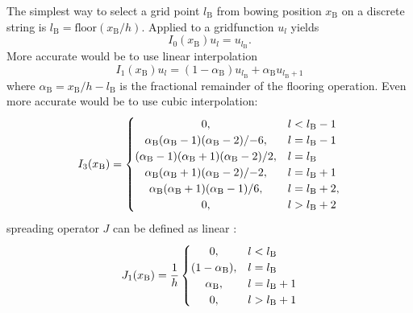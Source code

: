 \documentclass[twoside,a4paper]{article}
\begin{document}
The simplest way to select a grid point $l_\text{B}$ from bowing position $x_\text{B}$ on a discrete string is $l_\text{B} = \text{floor}(x_\text{B}/h)$. Applied to a gridfunction $u_l$ yields
\begin{equation}
    I_0(x_\text{B})u_l = u_{l_\text{B}}.
\end{equation}
More accurate would be to use linear interpolation 
\begin{equation}\label{eq:linearInterpolation}
     I_1(x_\text{B})u_l =
      (1-\alpha_\text{B})u_{l_\text{B}}+ \alpha_\text{B}u_{l_\text{B}+1}
\end{equation}
where $\alpha_\text{B} = x_\text{B}/h - l_\text{B}$ is the fractional remainder of the flooring operation. Even more accurate would be to use cubic interpolation:
\begin{equation}
I_3(x_\text{B}) =
     \begin{cases}
    \hfil 0, & l < l_{\text{B}} - 1\\
    \hfil \alpha_\text{B}(\alpha_\text{B}-1)(\alpha_\text{B} - 2)/{-6}, & l = l_{\text{B}} - 1\\
    \hfil (\alpha_\text{B}-1)(\alpha_\text{B}+1)(\alpha_\text{B}-2)/2, & l = l_{\text{B}}\\
    \hfil \alpha_\text{B}(\alpha_\text{B}+1)(\alpha_\text{B} - 2)/{-2}, & l = l_{\text{B}} + 1\\
    \hfil \alpha_\text{B}(\alpha_\text{B}+1)(\alpha_\text{B} - 1)/6, & l = l_{\text{B}} +2,\\
    \hfil 0, & l > l_\text{B} + 2
    \end{cases}
    \end{equation}
spreading operator $J$ can be defined as linear \cite{Bilbao2009}:
\begin{equation}\label{eq:linearInterpolation}
     J_1(x_\text{B}) = \frac{1}{h}
     \begin{cases}
    \hfil 0, & l < l_{\text{B}}\\
    \hfil (1-\alpha_\text{B}), & l = l_{\text{B}}\\
    \hfil \alpha_\text{B}, & l = l_{\text{B}} + 1\\
    \hfil 0, & l > l_\text{B} + 1
\end{cases}
\end{equation}
\end{document}
